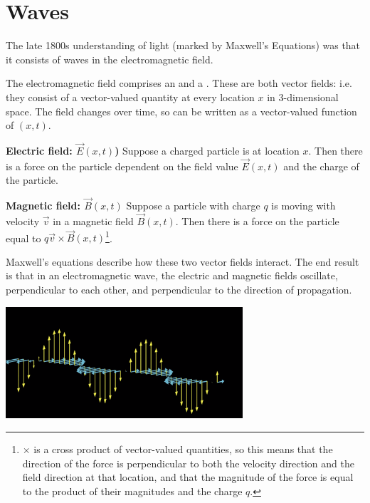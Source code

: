 \section{Waves}

The late 1800s understanding of light (marked by Maxwell's Equations) was that it consists of waves
in the electromagnetic field.

The electromagnetic field comprises an  and a . These are
both vector fields: i.e. they consist of a vector-valued quantity at every location $x$ in
3-dimensional space. The field changes over time, so can be written as a vector-valued function of
$(x, t)$.

{\bf Electric field: $\vec E(x, t)$)} Suppose a charged particle is at location $x$. Then there is a
force on the particle dependent on the field value $\vec E(x, t)$ and the charge of the particle.

{\bf Magnetic field: $\vec B(x, t)$} Suppose a particle with charge $q$ is moving with velocity
$\vec v$ in a magnetic field $\vec B(x, t)$. Then there is a force on the particle equal to
$q\vec v \times \vec B(x, t)$\footnote{$\times$ is a cross product of vector-valued quantities, so
  this means that the direction of the force is perpendicular to both the velocity direction and the
  field direction at that location, and that the magnitude of the force is equal to the product of
  their magnitudes and the charge $q$.}.

Maxwell's equations describe how these two vector fields interact.  The end result is that in an
electromagnetic wave, the electric and magnetic fields oscillate, perpendicular to each other, and
perpendicular to the direction of propagation.

\includegraphics[width=250pt]{img/quantum-waves-1.png}

